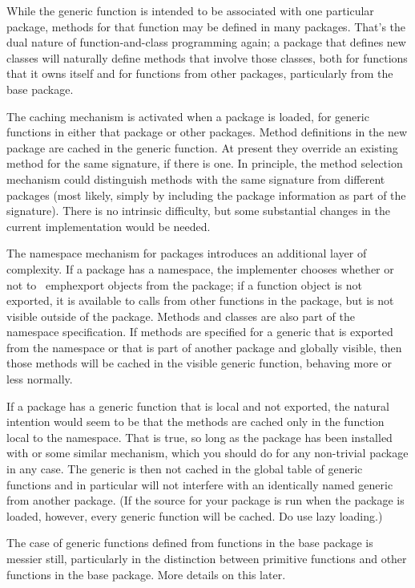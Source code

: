 \documentclass[11pt]{article}
\begin{document}
While the generic function is intended to be associated with one particular package, methods for that function may be defined in many packages.
That's the dual nature of function-and-class programming again; a package that defines new classes will naturally define methods that involve those classes, both for functions that it owns itself and for functions from other packages, particularly from the base package.

The caching mechanism is activated when a package is loaded, for generic functions in either that package or other packages.
Method definitions in the new package are cached in the generic function.
At present they override an existing method for the same signature, if there is one.
In principle, the method selection mechanism could distinguish methods with the same signature from different packages (most likely, simply by including the package information as part of the signature).
There is no intrinsic difficulty, but some substantial changes in the current implementation would be needed.

The namespace mechanism for packages introduces an additional layer of complexity.
If a package has a namespace, the implementer chooses whether or not to \ emph{export} objects from the package; if a function object is not exported, it is available to calls from other functions in the package, but is not visible outside of the package.
Methods and classes are also part of the namespace specification.
If methods are specified for a generic that is exported from the namespace or that is part of another package and globally visible, then those methods will be cached in the visible generic function, behaving more or less normally.

If a package has a generic function that is local and not exported, the natural intention would seem to be that the methods are cached only in the function local to the namespace.
That is true, so long as the package has been installed with  or some similar mechanism, which you should do for any non-trivial package in any case.
The generic is then not cached in the global table of generic functions and in particular will not interfere with an identically named generic from another package.
(If the source for  your package is run when the package is loaded, however, every generic function will be cached.  Do use lazy loading.)

The case of generic functions defined from functions in the base package is messier still, particularly in the distinction between primitive functions and other functions in the base package.
More details on this later.
\end{document}
